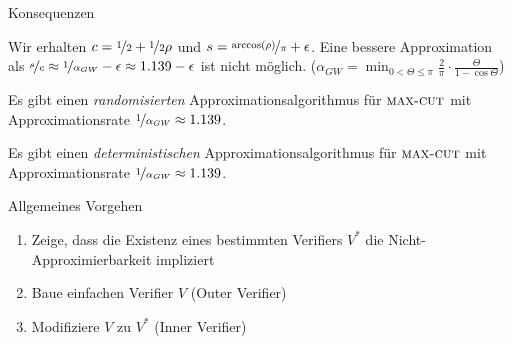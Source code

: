 \documentclass[table,german,10pt]{beamer}
\begin{document}
\begin{frame}{Konsequenzen}
  \begin{theorem}
    Wir erhalten $c=\nicefrac{1}{2}+\nicefrac{1}{2}\rho$ und
    $s=\nicefrac{\arccos(\rho)}{\pi}+\epsilon$. Eine bessere
    Approximation als $\nicefrac{s}{c}\approx
    \nicefrac{1}{\alpha_{GW}}-\epsilon\approx 1{.}139-\epsilon$ ist
    nicht möglich. ($\alpha_{GW}=\min_{0<\Theta\leq \pi}
    \frac{2}{\pi}\cdot \frac{\Theta}{1-\cos \Theta}$)
  \end{theorem}
  \pause
    \begin{theorem}
      Es gibt einen \emph{randomisierten} Approximationsalgorithmus für
      $\textsc{max-cut}$ mit Approximationsrate
      $\nicefrac{1}{\alpha_{GW}}\approx 1{.}139$.
    \end{theorem}
    \pause
    \begin{theorem}
      Es gibt einen \emph{deterministischen} Approximationsalgorithmus
      für $\textsc{max-cut}$ mit Approximationsrate
      $\nicefrac{1}{\alpha_{GW}}\approx 1{.}139$.
    \end{theorem}

  
\end{frame}
\begin{frame}{Allgemeines Vorgehen}
  \begin{enumerate}[<+->]
  \item Zeige, dass die Existenz eines bestimmten Verifiers $V^{*}$ die
    Nicht-Approximierbarkeit impliziert
  \item Baue einfachen Verifier $V$ (Outer Verifier)
  \item Modifiziere $V$ zu $V^{*}$ (Inner Verifier)
  \end{enumerate}
  
\end{frame}
\end{document}
